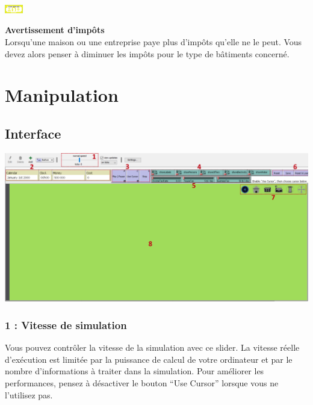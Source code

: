 \documentclass[11pt]{report}
\begin{document}
\\
\\
\\
\begin{minipage}{0.1\textwidth}
	\begin{center}
		\includegraphics[width=30px]{taxes_warning}
	\end{center}
\end{minipage}
\begin{minipage}{0.85\textwidth}
	\textbf{Avertissement d'impôts}\\
	Lorsqu'une maison ou une entreprise paye plus d'impôts qu'elle ne le peut. Vous devez alors penser à diminuer les impôts pour le type de bâtiments concerné.
\end{minipage}



\section{Manipulation}

\subsection{Interface}
\begin{center}
	\includegraphics[width=\textwidth]{labeled_interface}
\end{center}

\subsubsection{1 : Vitesse de simulation}
Vous pouvez contrôler la vitesse de la simulation avec ce slider. La vitesse réelle d'exécution est limitée par la puissance de calcul de votre ordinateur et par le nombre d'informations à traiter dans la simulation. Pour améliorer les performances, pensez à désactiver le bouton ``Use Cursor'' lorsque vous ne l'utilisez pas.
\end{document}
